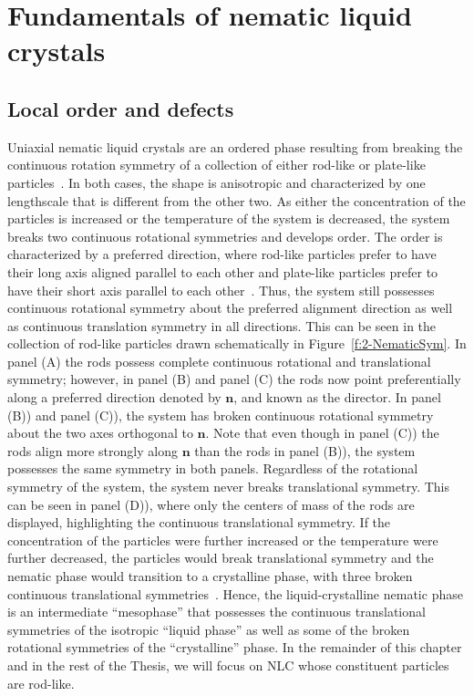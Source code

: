 \chapter{Fundamentals of nematic liquid crystals}

\section{Local order and defects}
Uniaxial nematic liquid crystals are an ordered phase resulting from breaking the continuous rotation symmetry of a collection of either rod-like or plate-like particles~\cite{RN33}.
In both cases, the shape is anisotropic and characterized by one lengthscale that is different from the other two.
As either the concentration of the particles is increased or the temperature of the system is decreased, the system breaks two continuous rotational symmetries and develops order.
The order is characterized by a preferred direction, where rod-like particles prefer to have their long axis aligned parallel to each other and plate-like particles prefer to have their short axis parallel to each other~\cite{RN33,RN175}.
Thus, the system still possesses continuous rotational symmetry about the preferred alignment direction as well as continuous translation symmetry in  all directions.
This can be seen in the collection of rod-like particles drawn schematically in Figure~\ref{f:2-NematicSym}.
In panel (A) the rods possess complete continuous rotational and translational symmetry; however, in panel (B) and panel (C) the rods now point preferentially along a preferred direction denoted by $\mathbf{n}$, and known as the director.
In panel (B)) and panel (C)), the system has broken continuous rotational symmetry about the two axes orthogonal to $\mathbf{n}$.
Note that even though in panel (C)) the rods align more strongly along $\mathbf{n}$ than the rods in panel (B)), the system possesses the same symmetry in both panels.
Regardless of the rotational symmetry of the system, the system never breaks translational symmetry.
This can be seen in panel (D)), where only the centers of mass of the rods are displayed, highlighting the continuous translational symmetry.
If the concentration of the particles were further increased or the temperature were further decreased, the particles would break translational symmetry and the nematic phase would transition to a crystalline phase, with three broken continuous translational symmetries~\cite{RN33}.
Hence, the liquid-crystalline nematic phase is an intermediate ``mesophase'' that possesses the continuous translational symmetries of the isotropic ``liquid phase'' as well as some of the broken rotational symmetries of the ``crystalline'' phase.
In the remainder of this chapter and in the rest of the Thesis, we will focus on NLC whose constituent particles are rod-like.

